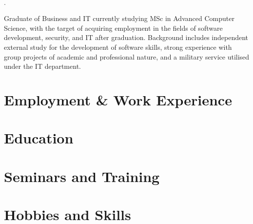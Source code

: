 \documentclass{template}
\begin{document}
\thispagestyle{empty}
\pagestyle{fancy}

\centering

\\
.
\\
\justify

Graduate of Business and IT currently studying MSc in Advanced Computer Science, with the target of acquiring employment in the fields of software development, security, and IT after graduation. Background includes independent external study for the development of software skills, strong experience with group projects of academic and professional nature, and a military service utilised under the IT department.


\section{Employment \& Work Experience}


\section{Education}


\section{Seminars and Training}


\section{Hobbies and Skills}

\end{document}
